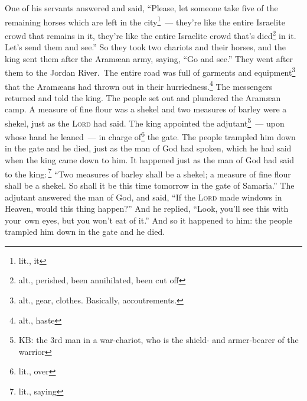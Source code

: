 \begin{inparaenum}
     One of his servants answered and said, ``Please, let someone take five of the remaining horses which are left in the city\understood\footnote{lit., it}~--- they're like the entire Israelite crowd that remains in it, they're like the entire Israelite crowd that's died\footnote{alt., perished, been annihilated, been cut off} in it. Let's send them and see.''%
     So they took two chariots and their horses, and the king sent them after the Aram\ae{}an army, saying, ``Go and see.''%
     They went after them to the Jordan River.\understood\ The entire road was full of garments and equipment\footnote{alt., gear, clothes. Basically, accoutrements.} that the Aram\ae{}ans had thrown out in their hurriedness.\footnote{alt., haste} The messengers returned and told the king.%
     The people set out and plundered the Aram\ae{}an camp. A measure of fine flour was a shekel and two measures of barley were a shekel, just as the \textsc{Lord} had said.%
     The king appointed the adjutant\footnote{KB: the 3rd man in a war-chariot, who is the shield- and armer-bearer of the warrior}~--- upon whose hand he leaned~--- in charge of\footnote{lit., over} the gate. The people trampled him down in the gate and he died, just as the man of God had spoken, which he had said when the king came down to him.%
     It happened just as the man of God had said to the king:\,\footnote{lit., saying} ``Two measures of barley shall be a shekel; a measure of fine flour shall be a shekel. So shall it be this time tomorrow in the gate of Samaria.''%
     The adjutant answered the man of God, and said, ``If the \textsc{Lord} made windows in Heaven, would this thing happen?'' And he replied, ``Look, you'll see this with your\understood\ own eyes, but you won't eat of it.''%
     And so it happened to him: the people trampled him down in the gate and he died.%
\end{inparaenum}
